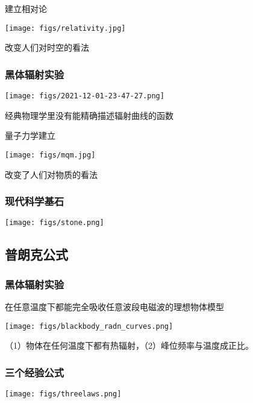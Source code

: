 \begin{frame}
    建立相对论
    \begin{center}
        \texttt{[image: figs/relativity.jpg]}
    \end{center}   
    改变人们对时空的看法
\end{frame}

\begin{frame}
    \frametitle{黑体辐射实验}
    \begin{center}
    \texttt{[image: figs/2021-12-01-23-47-27.png]}
    \end{center}
    经典物理学里没有能精确描述辐射曲线的函数
\end{frame}
\begin{frame}
    量子力学建立
    \begin{center}
        \texttt{[image: figs/mqm.jpg]}
    \end{center}   
    改变了人们对物质的看法
\end{frame}

\begin{frame}
    \frametitle{现代科学基石}
    \begin{center}
        \texttt{[image: figs/stone.png]}
    \end{center}   
\end{frame}

\subsection{普朗克公式}

\begin{frame}
    \frametitle{黑体辐射实验}
    \emf[黑体:]  在任意温度下都能完全吸收任意波段电磁波的理想物体模型
    \begin{center}
        \texttt{[image: figs/blackbody\_radn\_curves.png]}
    \end{center}
    \emf[实验发现：] （1）物体在任何温度下都有热辐射，（2）峰位频率与温度成正比。
\end{frame}

\begin{frame}
    \frametitle{三个经验公式}
    \begin{center}
        \texttt{[image: figs/threelaws.png]}
    \end{center}
\end{frame}

